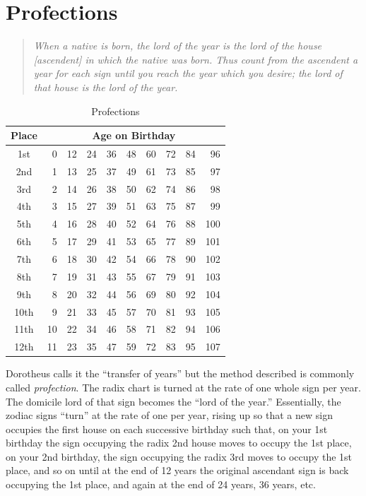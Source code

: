 \section{Profections}
\begin{quote}
\textsl{When a native is born, the lord of the year is the lord of the house [ascendent] in which the native was born. Thus count from the ascendent a year for each sign until you reach the year which you desire; the lord of that house is the lord of the year.}
\end{quote}

\begin{table}[h]
\small
\center
\begin{tabular}[c]{|c|r r r r r r r r r|}
\hline
Place & \multicolumn{9}{|c|}{Age on Birthday}\\
\hline
1st  & 0 & 12 & 24 & 36 & 48 & 60 & 72 & 84 & 96 \\
2nd & 1 & 13 & 25 & 37 & 49 & 61 & 73 & 85 & 97 \\
3rd  & 2 & 14 & 26 & 38 & 50 & 62 & 74 & 86 & 98 \\
\hline
4th  & 3 & 15 & 27 & 39 & 51 & 63 & 75 & 87 &  99 \\
5th  & 4 & 16 & 28 & 40 & 52 & 64 & 76 & 88 & 100 \\
6th  & 5 & 17 & 29 & 41 & 53 & 65 & 77 & 89 & 101 \\
\hline
7th  & 6 & 18 & 30 & 42 & 54 & 66 & 78 & 90 & 102 \\
8th  & 7 & 19 & 31 & 43 & 55 & 67 & 79 & 91 & 103 \\
9th  & 8 & 20 & 32 & 44 & 56 & 69 & 80 & 92 & 104 \\
\hline
10th  &   9 & 21 & 33 & 45 & 57 & 70 & 81 & 93 & 105 \\
11th  & 10 & 22 & 34 & 46 & 58 & 71 & 82 & 94 & 106 \\
12th  & 11 & 23 & 35 & 47 & 59 & 72 & 83 & 95 & 107 \\
\hline
\end{tabular}
\caption{Profections}
\end{table}

Dorotheus calls it the ``transfer of years'' but the method described is commonly called \textsl{profection}. The radix chart is turned at the rate of one whole sign per year. The domicile lord of that sign becomes the ``lord of the year.'' Essentially, the zodiac signs ``turn'' at the rate of one per year, rising up so that a new sign occupies the first house on each successive birthday such that, on your 1st birthday the sign occupying the radix 2nd house moves to occupy the 1st place, on your 2nd birthday, the sign occupying the radix 3rd moves to occupy the 1st place, and so on until at the end of 12 years the original ascendant sign is back occupying the 1st place, and again at the end of 24 years, 36 years, etc.

